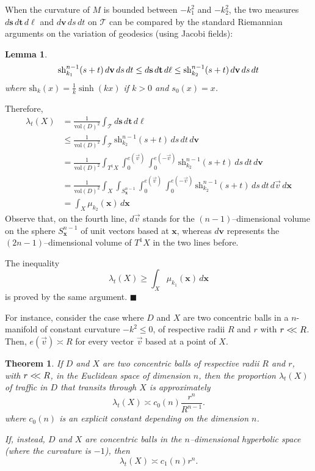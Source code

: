 \documentclass{article}
\newcommand{\s}{{\mathbf s}}
\renewcommand{\t}{{\mathbf t}}
\renewcommand{\v}{{\mathbf v}}
\newcommand{\x}{{\mathbf x}}
\newcommand{\sh}{\mathrm{sh}}
\newtheorem{lemma}{Lemma}
\newtheorem{theorem}{Theorem}
\newenvironment{proof}
{\noindent {\bf Proof.}}
{$\blacksquare$}
\begin{document}
\begin{proof}
When the curvature of $M$ is bounded between $-k_1^2$ and $-k_2^2$, 
the two measures $d\s\,d\t\,d\ell$ and $d{\v}\,ds\,dt$ on $\mathcal T$ can be compared 
by the standard Riemannian arguments on the variation of geodesics (using Jacobi fields):
\begin{lemma}
$$
\sh_{k_1}^{n-1}(s+t) \, d{\v}\,ds\,dt 
\leq  d\s\,d\t\,d\ell 
\leq \sh_{k_2}^{n-1}(s+t) \, d{\bf v}\,ds\,dt
$$
where $\sh_k(x) = \frac1k \sinh(kx)$ if $k >0$ and $s_0(x) = x$. 
\end{lemma}

Therefore,
\begin{align*}
\lambda_t(X) &= \frac 1{\mathrm{vol}(D)^2}  \int_{\mathcal T} d\s\,d\t\,d\ell \\
&\leq  \frac 1{\mathrm{vol}(D)^2}  \int_{\mathcal T} \sh_{k_2}^{n-1}(s+t) \,ds\,dt\, d{\v}\\
&=  \frac 1{\mathrm{vol}(D)^2}  \int_{T^1X} 
\int_0^{e(\vec{v})}
\int_0^{e(-\vec{v})}
\sh_{k_2}^{n-1} (s+t)
\,  ds\, dt\, d{\v}
    \\
 &=  \frac 1{\mathrm{vol}(D)^2}  \int_{X} \int_{S^{n-1}_\x}
\int_0^{e(\vec{v})}
\int_0^{e(-\vec{v})}
\sh_{k_2}^{n-1} (s+t)
\, ds\, dt \, d\vec{v}\, d\x
  \\
& = \int_X \mu_{k_2} (\x) \,d\x
\end{align*}
Observe that, on the fourth line, 
$d\vec{v}$ stands for the $(n-1)$--dimensional volume on the sphere $S^{n-1}_\x$ of unit vectors based at $\x$, 
whereas  $d{\v}$ represents the $(2n-1)$--dimensional volume of $T^1X$ in the two lines before. 

The inequality 
$$
\lambda_t(X)  \geq  \int_X \mu_{k_1} (\x) \,d\x
$$
is proved by the same argument. 
\end{proof}


For instance, consider the case where $D$ and $X$ are two concentric balls in a $n$-manifold of constant curvature $-k^2\leq 0$, of respective radii $R$ and $r$ with $r<\kern -3pt<R$. 
Then, $e(\vec{v})\asymp R$ for every vector $\vec{v}$ based at a point of $X$. 


\begin{theorem}
If $D$ and $X$ are two concentric balls of respective radii $R$ and $r$, with  $r<\kern -3pt<R$, in the Euclidean space of dimension $n$, then the proportion $\lambda_t(X)$ of traffic in $D$ that transits through $X$ is approximately
$$
\lambda_t(X) \asymp c_0(n) \frac{r^n}{R^{n-1}}.
$$
where $c_0(n)$ is an explicit constant depending on the dimension $n$. 

If, instead, $D$ and $X$ are concentric balls in the $n$--dimensional  hyperbolic space (where the curvature is $-1$), then
$$
\lambda_t(X) \asymp c_1(n)  r^n.
$$

\end{theorem}
\end{document}
